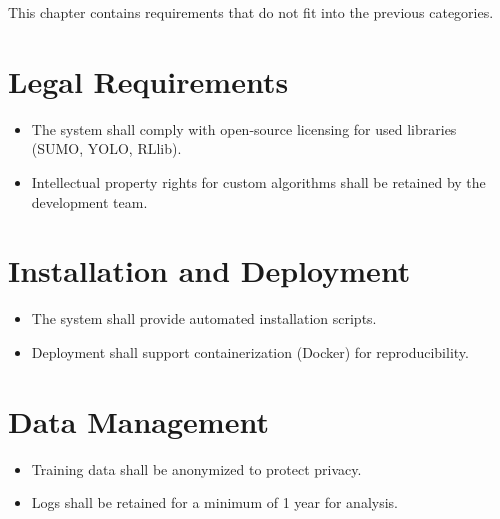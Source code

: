 This chapter contains requirements that do not fit into the previous categories.

\section{Legal Requirements}

\begin{itemize}
\item The system shall comply with open-source licensing for used libraries (SUMO, YOLO, RLlib).
\item Intellectual property rights for custom algorithms shall be retained by the development team.
\end{itemize}

\section{Installation and Deployment}

\begin{itemize}
\item The system shall provide automated installation scripts.
\item Deployment shall support containerization (Docker) for reproducibility.
\end{itemize}

\section{Data Management}

\begin{itemize}
\item Training data shall be anonymized to protect privacy.
\item Logs shall be retained for a minimum of 1 year for analysis.
\end{itemize}
